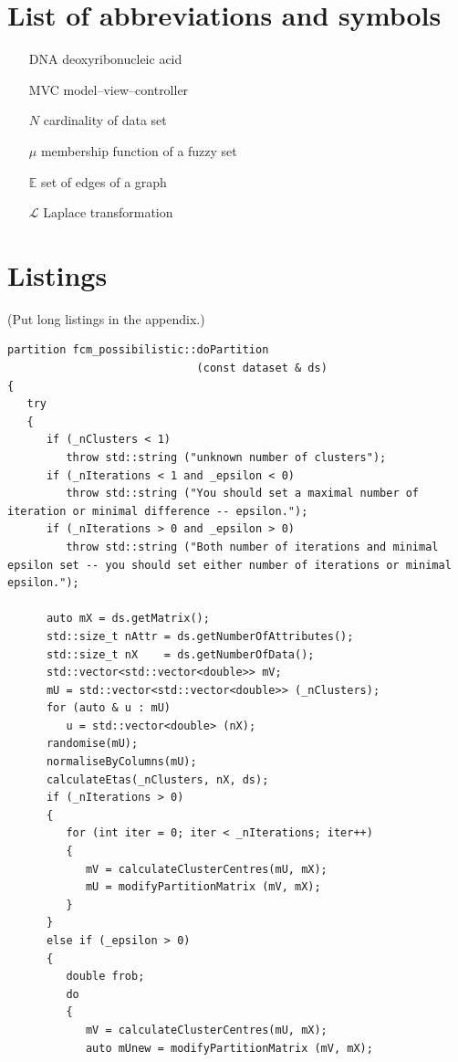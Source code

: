 \documentclass[a4paper,twoside,12pt]{book}
\newcounter{PagesWithoutNumbers}
\begin{document}
 


\backmatter
{}
\setcounter{page}{\value{PagesWithoutNumbers}}

\pagestyle{onlyPageNumbers}





\begin{appendices} 


 

\chapter*{List of abbreviations and symbols}

\begin{itemize}
\item[DNA] deoxyribonucleic acid
\item[MVC] model--view--controller 
\item[$N$] cardinality of data set
\item[$\mu$] membership function of a fuzzy set
\item[$\mathbb{E}$] set of edges of a graph
\item[$\mathcal{L}$] Laplace transformation
\end{itemize}


\chapter*{Listings}

(Put long listings in the appendix.)


\iffalse
\begin{lstlisting}
partition fcm_possibilistic::doPartition
                             (const dataset & ds)
{
   try
   {
      if (_nClusters < 1)
         throw std::string ("unknown number of clusters");
      if (_nIterations < 1 and _epsilon < 0)
         throw std::string ("You should set a maximal number of iteration or minimal difference -- epsilon.");
      if (_nIterations > 0 and _epsilon > 0)
         throw std::string ("Both number of iterations and minimal epsilon set -- you should set either number of iterations or minimal epsilon.");
   
      auto mX = ds.getMatrix();
      std::size_t nAttr = ds.getNumberOfAttributes();
      std::size_t nX    = ds.getNumberOfData();
      std::vector<std::vector<double>> mV;
      mU = std::vector<std::vector<double>> (_nClusters);
      for (auto & u : mU)
         u = std::vector<double> (nX);
      randomise(mU);
      normaliseByColumns(mU);
      calculateEtas(_nClusters, nX, ds);
      if (_nIterations > 0)
      {
         for (int iter = 0; iter < _nIterations; iter++)
         {
            mV = calculateClusterCentres(mU, mX);
            mU = modifyPartitionMatrix (mV, mX);
         }
      }
      else if (_epsilon > 0)
      {
         double frob;
         do 
         {
            mV = calculateClusterCentres(mU, mX);
            auto mUnew = modifyPartitionMatrix (mV, mX);
            

\end{lstlisting}
\end{appendices}
\end{document}
